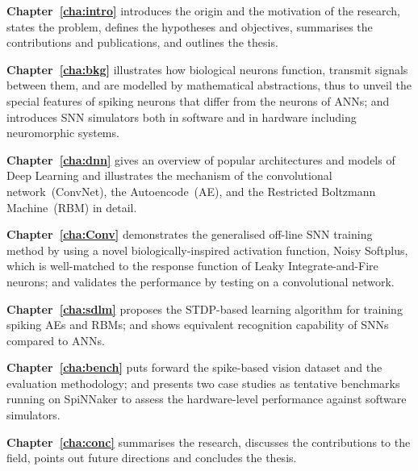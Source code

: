 \textbf{Chapter~\ref{cha:intro}} introduces the origin and the motivation of the research, states the problem, defines the hypotheses and objectives, summarises the contributions and publications, and outlines the thesis. 

\textbf{Chapter~\ref{cha:bkg}} %
illustrates how biological neurons function, transmit signals between them, and are modelled by mathematical abstractions, thus to unveil the special features of spiking neurons that differ from the neurons of ANNs; and introduces SNN simulators both in software and in hardware including neuromorphic systems.

\textbf{Chapter~\ref{cha:dnn}} gives an overview of popular architectures and models of Deep Learning and illustrates the mechanism of the convolutional network~(ConvNet), the Autoencode~(AE), and the Restricted Boltzmann Machine~(RBM) in detail.

\textbf{Chapter~\ref{cha:Conv}} demonstrates the generalised off-line SNN training method by using a novel biologically-inspired activation function, Noisy Softplus, which is well-matched to the response function of Leaky Integrate-and-Fire neurons; and validates the performance by testing on a convolutional network.

\textbf{Chapter~\ref{cha:sdlm}} proposes the STDP-based learning algorithm for training spiking AEs and RBMs; and shows equivalent recognition capability of SNNs compared to ANNs.

\textbf{Chapter~\ref{cha:bench}} puts forward the spike-based vision dataset and the evaluation methodology; and presents two case studies as tentative benchmarks running on SpiNNaker to assess the hardware-level performance against software simulators.

\textbf{Chapter~\ref{cha:conc}} summarises the research, discusses the contributions to the field, points out future directions and concludes the thesis.

